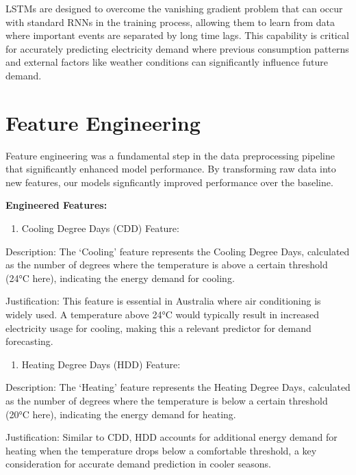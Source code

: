 \documentclass[mstat,12pt]{unswthesis}
\providecommand{\tightlist}{%
  \setlength{\itemsep}{0pt}\setlength{\parskip}{0pt}}
\begin{document}
LSTMs are designed to overcome the vanishing gradient problem that can
occur with standard RNNs in the training process, allowing them to learn
from data where important events are separated by long time lags. This
capability is critical for accurately predicting electricity demand
where previous consumption patterns and external factors like weather
conditions can significantly influence future demand.

\section{Feature Engineering}\label{feature-engineering}

Feature engineering was a fundamental step in the data preprocessing
pipeline that significantly enhanced model performance. By transforming
raw data into new features, our models signficantly improved performance
over the baseline.

\textbf{Engineered Features:}

\begin{enumerate}
\def\labelenumi{\arabic{enumi}.}
\tightlist
\item
  Cooling Degree Days (CDD) Feature:
\end{enumerate}

Description: The `Cooling' feature represents the Cooling Degree Days,
calculated as the number of degrees where the temperature is above a
certain threshold (24°C here), indicating the energy demand for cooling.

Justification: This feature is essential in Australia where air
conditioning is widely used. A temperature above 24°C would typically
result in increased electricity usage for cooling, making this a
relevant predictor for demand forecasting.

\begin{enumerate}
\def\labelenumi{\arabic{enumi}.}
\setcounter{enumi}{1}
\tightlist
\item
  Heating Degree Days (HDD) Feature:
\end{enumerate}

Description: The `Heating' feature represents the Heating Degree Days,
calculated as the number of degrees where the temperature is below a
certain threshold (20°C here), indicating the energy demand for heating.

Justification: Similar to CDD, HDD accounts for additional energy demand
for heating when the temperature drops below a comfortable threshold, a
key consideration for accurate demand prediction in cooler seasons.
\end{document}

